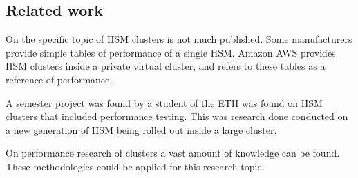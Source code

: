 \subsection{Related work}
On the specific topic of HSM clusters is not much published.
Some manufacturers provide simple tables of performance of a single HSM.
Amazon AWS provides HSM clusters inside a private virtual cluster,
and refers to these tables as a reference of performance.

A semester project was found by a student of the ETH was found on HSM clusters that included performance testing\cite{hsmperformance}.
This was research done conducted on a new generation of HSM being rolled out inside a large cluster.

On performance research of clusters a vast amount of knowledge can be found.
These methodologies could be applied for this research topic.

